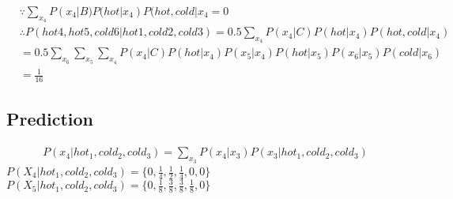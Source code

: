\documentclass[12pt]{amsart}
\begin{document}
\begin{align*}
&\because   \sum_{x_4} P(x_4| B)P(hot|x_4)P(hot, cold|x_{4} = 0 \\
&\therefore  P(hot4, hot5, cold6 | hot1, cold2, cold3) = 0.5 \sum_{x_4} P(x_4| C)P(hot|x_4)P(hot, cold |x_{4}) \\
	& =0.5 \sum_{x_6}\sum_{x_5}\sum_{x_4} P(x_4| C)P(hot|x_4) P(x_5|x_4) P(hot|x_5) P(x_6|x_5) P(cold|x_6)\\
	&= \frac{1}{16}
\end{align*}

\subsection*{Prediction}
\begin{align*}
P(x_4 | hot_1, cold_2, cold_3) = \sum_{x_3}P(x_4| x_3) P(x_3 | hot_1, cold_2, cold_3)
\end{align*}
$P(X_4 | hot_1, cold_2, cold_3) = \{0, \frac{1}{4}, \frac{1}{2}, \frac{1}{4}, 0, 0  \}$
$P(X_5 | hot_1, cold_2, cold_3) = \{0, \frac{1}{8}, \frac{3}{8}, \frac{3}{8}, \frac{1}{8}, 0  \}$
\end{document}
